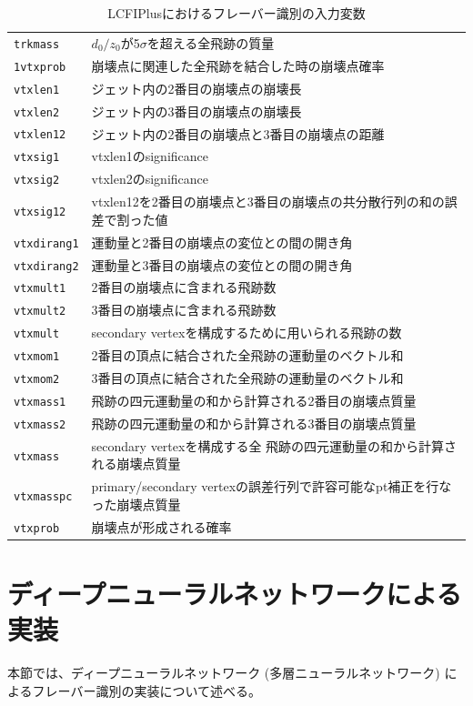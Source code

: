 \begin{table}[H]
\begin{tabular}{ l | l }
   \texttt{trkmass} & $d_0/z_0$が5$\sigma$を超える全飛跡の質量\\
   \texttt{1vtxprob} & 崩壊点に関連した全飛跡を結合した時の崩壊点確率\\
   \texttt{vtxlen1} & ジェット内の2番目の崩壊点の崩壊長\\
   \texttt{vtxlen2} & ジェット内の3番目の崩壊点の崩壊長\\
   \texttt{vtxlen12} & ジェット内の2番目の崩壊点と3番目の崩壊点の距離\\
   \texttt{vtxsig1} & vtxlen1のsignificance\\
   \texttt{vtxsig2} & vtxlen2のsignificance\\
   \texttt{vtxsig12} & vtxlen12を2番目の崩壊点と3番目の崩壊点の共分散行列の和の誤差で割った値\\
   \texttt{vtxdirang1} & 運動量と2番目の崩壊点の変位との間の開き角\\
   \texttt{vtxdirang2} & 運動量と3番目の崩壊点の変位との間の開き角\\
   \texttt{vtxmult1} & 2番目の崩壊点に含まれる飛跡数\\
   \texttt{vtxmult2} & 3番目の崩壊点に含まれる飛跡数\\
   \texttt{vtxmult} & secondary vertexを構成するために用いられる飛跡の数\\
   \texttt{vtxmom1} & 2番目の頂点に結合された全飛跡の運動量のベクトル和\\
   \texttt{vtxmom2} & 3番目の頂点に結合された全飛跡の運動量のベクトル和\\
   \texttt{vtxmass1} & 飛跡の四元運動量の和から計算される2番目の崩壊点質量\\
   \texttt{vtxmass2} & 飛跡の四元運動量の和から計算される3番目の崩壊点質量\\
   \texttt{vtxmass} & secondary vertexを構成する全 飛跡の四元運動量の和から計算される崩壊点質量\\
   \texttt{vtxmasspc} & primary/secondary vertexの誤差行列で許容可能なpt補正を行なった崩壊点質量\\
   \texttt{vtxprob} & 崩壊点が形成される確率\\
   \hline
  \end{tabular}
  \caption{LCFIPlusにおけるフレーバー識別の入力変数}
 \label{lcfiplusin}
\end{table}
\section{ディープニューラルネットワークによる実装}
本節では、ディープニューラルネットワーク (多層ニューラルネットワーク) によるフレーバー識別の実装について述べる。
